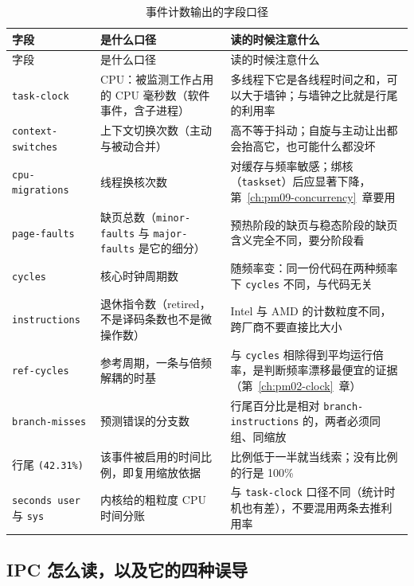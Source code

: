 \documentclass[12pt,a4paper,fontset=fandol]{ctexbook}
\newcommand{\Tp}[1]{\texttt{#1}}
\newcommand{\Bk}{\discretionary{}{}{}}
\newcommand{\Lang}[1]{\textsf{#1}}
\newcommand{\MCpu}{\Lang{CPU}}
\newcommand{\Mx}[1]{\textsf{#1}}
\begin{document}
\begin{longtable}{>{\raggedright\arraybackslash}p{} >{\raggedright\arraybackslash}p{} >{\raggedright\arraybackslash}p{}}
\caption{事件计数输出的字段口径}\label{tab:pm05-field}\\
\hline
字段 & 是什么口径 & 读的时候注意什么 \\
\hline
\endfirsthead
\hline
字段 & 是什么口径 & 读的时候注意什么 \\
\hline
\endhead
\hline
\endfoot
\hline
\endlastfoot
\Tp{task{\Bk}-clock} & \MCpu{}：被监测工作占用的 CPU 毫秒数（软件事件，含子进程） &
  多线程下它是各线程时间之和，可以大于墙钟；与墙钟之比就是行尾的利用率 \\
\Tp{context{\Bk}-switches} & 上下文切换次数（主动与被动合并） &
  高不等于抖动；自旋与主动让出都会抬高它，也可能什么都没坏 \\
\Tp{cpu{\Bk}-migrations} & 线程换核次数 &
  对缓存与频率敏感；绑核（\Tp{taskset}）后应显著下降，第~\ref{ch:pm09-concurrency}~章要用 \\
\Tp{page{\Bk}-faults} & 缺页总数（\Tp{minor{\Bk}-faults} 与 \Tp{major{\Bk}-faults} 是它的细分） &
  预热阶段的缺页与稳态阶段的缺页含义完全不同，要分阶段看 \\
\Tp{cycles} & 核心时钟周期数 &
  随频率变：同一份代码在两种频率下 \Tp{cycles} 不同，与代码无关 \\
\Tp{instructions} & 退休指令数（retired，不是译码条数也不是微操作数） &
  Intel 与 AMD 的计数粒度不同，跨厂商不要直接比大小 \\
\Tp{ref{\Bk}-cycles} & 参考周期，一条与倍频解耦的时基 &
  与 \Tp{cycles} 相除得到平均运行倍率，是判断频率漂移最便宜的证据（第~\ref{ch:pm02-clock}~章） \\
\Tp{branch{\Bk}-misses} & 预测错误的分支数 &
  行尾百分比是相对 \Tp{branch{\Bk}-instructions} 的，两者必须同组、同缩放 \\
行尾 \Tp{(42.31\%)} & 该事件被启用的时间比例，即复用缩放依据 &
  比例低于一半就当线索；没有比例的行是 100\% \\
\Tp{seconds user} 与 \Tp{sys} & 内核给的粗粒度 CPU 时间分账 &
  与 \Tp{task-clock} 口径不同（统计时机也有差），不要混用两条去推利用率 \\
\end{longtable}

\subsection*{\Mx{IPC} 怎么读，以及它的四种误导}
\end{document}

